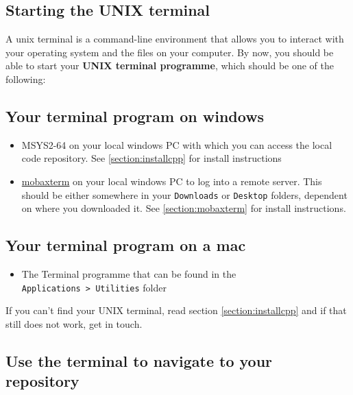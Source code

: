 \documentclass[
]{book}
\providecommand{\tightlist}{%
  \setlength{\itemsep}{0pt}\setlength{\parskip}{0pt}}
\begin{document}
\hypertarget{starting-the-unix-terminal}{%
\subsection{Starting the UNIX terminal}\label{starting-the-unix-terminal}}

A unix terminal is a command-line environment that allows you to interact with your operating system and the files on your computer.
By now, you should be able to start your \textbf{UNIX terminal programme}, which should be one of the following:

\hypertarget{your-terminal-program-on-windows}{%
\subsection{Your terminal program on windows}\label{your-terminal-program-on-windows}}

\begin{itemize}
\tightlist
\item
  MSYS2-64 on your local windows PC with which you can access the local code repository. See \ref{section:installcpp} for install instructions
\item
  \href{https://mobaxterm.mobatek.net/download.html}{mobaxterm} on your local windows PC to log into a remote server. This should be either somewhere in your \texttt{Downloads} or \texttt{Desktop} folders, dependent on where you downloaded it. See \ref{section:mobaxterm} for install instructions.
\end{itemize}

\hypertarget{your-terminal-program-on-a-mac}{%
\subsection{Your terminal program on a mac}\label{your-terminal-program-on-a-mac}}

\begin{itemize}
\tightlist
\item
  The Terminal programme that can be found in the \texttt{Applications\ \textgreater{}\ Utilities} folder
\end{itemize}

If you can't find your UNIX terminal, read section \ref{section:installcpp} and if that still does not work, get in touch.

\hypertarget{use-the-terminal-to-navigate-to-your-repository}{%
\subsection{Use the terminal to navigate to your repository}\label{use-the-terminal-to-navigate-to-your-repository}}
\end{document}
